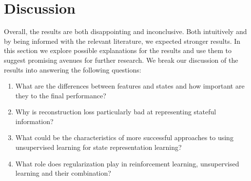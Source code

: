 %
%
%




\chapter{Discussion}
\label{ch-discussion}
Overall, the results are both disappointing and inconclusive.
Both intuitively and by being informed with the relevant literature,
we expected stronger results. 
In this section we explore possible explanations for the results
and use them to suggest promising avenues for further research.
We break our discussion of the results into answering the following questions:
\begin{enumerate}
		\item What are the differences between features and states 
				and how important are they to the final performance?
		\item Why is reconstruction loss particularly bad at representing
				stateful information?
		\item What could be the characteristics of more successful approaches
				to using unsupervised learning for state representation learning?
		\item What role does regularization play in reinforcement learning,
				unsupervised learning and their combination?
\end{enumerate}

